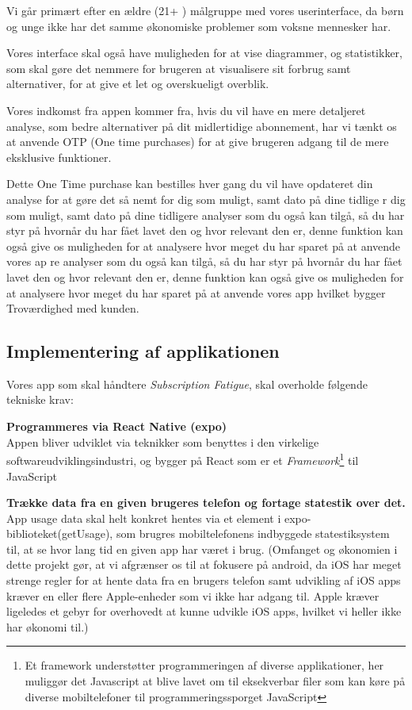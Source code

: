 Vi går primært efter en ældre (21+ ) målgruppe med vores userinterface, da børn og unge ikke har det samme økonomiske problemer som voksne mennesker har. 

Vores interface skal også have muligheden for at vise diagrammer, og statistikker, som skal gøre det nemmere for brugeren at visualisere sit forbrug samt alternativer, for at give et let og overskueligt overblik. 

Vores indkomst fra appen kommer fra, hvis du vil have en mere detaljeret analyse, som bedre alternativer på dit midlertidige abonnement, har vi tænkt os at anvende OTP (One time purchases) for at give brugeren adgang til de mere eksklusive funktioner. 

Dette One Time purchase kan bestilles hver gang du vil have opdateret din analyse for at gøre det så nemt for dig som muligt, samt dato på dine tidlige r dig som muligt, samt dato på dine tidligere analyser som du også kan tilgå, så du har styr på hvornår du har fået lavet den og hvor relevant den er, denne funktion kan også give os muligheden for at analysere hvor meget du har sparet på at anvende vores ap re analyser som du også kan tilgå, så du har styr på hvornår du har fået lavet den og hvor relevant den er, denne funktion kan også give os muligheden for at analysere hvor meget du har sparet på at anvende vores app hvilket bygger Troværdighed med kunden. 



\subsection{Implementering af applikationen}
Vores app som skal håndtere \textit{Subscription Fatigue}, skal overholde følgende tekniske krav:

\textbf{Programmeres via React Native (expo)}\\
Appen bliver udviklet via teknikker som benyttes i den virkelige softwareudviklingsindustri, og bygger på React som er et \textit{Framework}\footnote{Et framework understøtter programmeringen af diverse applikationer, her muliggør det Javascript at blive lavet om til eksekverbar filer som kan køre på diverse mobiltelefoner til programmeringssporget JavaScript} til JavaScript

\textbf{Trække data fra en given brugeres telefon og fortage statestik over det. \label{sec:krav_stat}}\\
App usage data skal helt konkret hentes via et element i expo-biblioteket(getUsage), som brugres mobiltelefonens indbyggede statestiksystem til, at se hvor lang tid en given app har været i brug. (Omfanget og økonomien i dette projekt gør, at vi afgrænser os til at fokusere på android, da iOS har meget strenge regler for at hente data fra en brugers telefon samt udvikling af iOS apps kræver en eller flere Apple-enheder som vi ikke har adgang til. Apple kræver ligeledes et gebyr for overhovedt at kunne udvikle iOS apps, hvilket vi heller ikke har økonomi til.)


